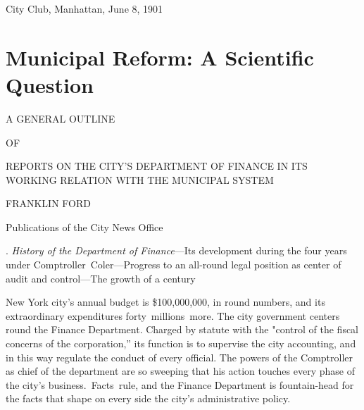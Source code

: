 \documentclass[twoside,symmetric,nobib,justified]{tufte-book}
\let\oldchapter\chapter
\def\chapter{%
  \setcounter{footnote}{0}%
  \oldchapter
}
\begin{document}
{\large City Club, Manhattan, June 8, 1901}


\chapter[Municipal Reform: A Scientific Question]{Municipal Reform: A Scientific\\\noindent Question}
\label{ch:Municipal Reform: A Scientific Question}

\vspace{.2in}

\begin{LARGE}


\end{LARGE}

\vspace{0.5in}

\begin{center}

{\LARGE A GENERAL OUTLINE}

\vspace{0.15in}

{\Large OF}

\vspace{0.15in} {\LARGE REPORTS ON THE CITY'S DEPARTMENT OF
FINANCE IN ITS WORKING RELATION WITH THE MUNICIPAL
SYSTEM}

\vspace{0.25in}

{\Large FRANKLIN FORD}

\vspace{0.25in}

{\LARGE Publications of the City News Office}

\end{center}

\vspace{0.25in}

. \emph{History of the Department of Finance}---Its development during
the four years under Comptroller~Coler---Progress to an all-round legal
position as center of audit and control---The growth of a century~~

New York city's annual budget is \$100,000,000, in round numbers, and
its extraordinary expenditures forty~millions~more. The city government
centers round the Finance Department. Charged by statute with the
"control of the fiscal concerns of the corporation,'' its function is to
supervise the city accounting, and in this way regulate the conduct of
every official. The powers of the Comptroller as chief of the department
are so sweeping that his action touches every phase of the city's
business.~Facts~rule, and the Finance Department is fountain-head for
the facts that shape on every side the city's administrative policy.~
\end{document}
